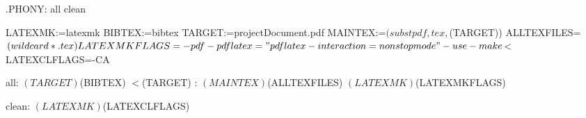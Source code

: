 .PHONY: all clean

LATEXMK:=latexmk
BIBTEX:=bibtex
TARGET:=projectDocument.pdf
MAINTEX:=$(subst pdf,tex,$(TARGET))
ALLTEXFILES=$(wildcard *.tex)

LATEXMKFLAGS=-pdf -pdflatex="pdflatex -interaction=nonstopmode" -use-make $<
LATEXCLFLAGS=-CA

all: $(TARGET)

	$(BIBTEX) $<

$(TARGET) : $(MAINTEX) $(ALLTEXFILES)
	$(LATEXMK) $(LATEXMKFLAGS)

clean:
	$(LATEXMK) $(LATEXCLFLAGS)
